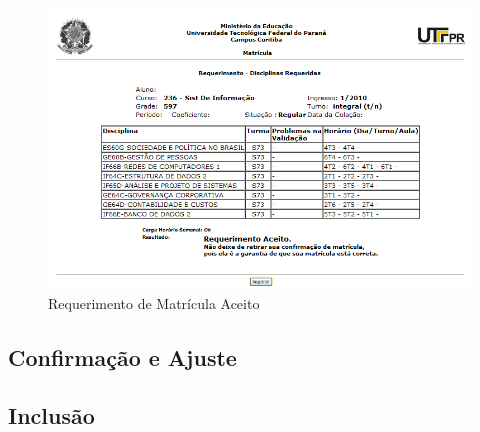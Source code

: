 \documentclass[a4paper,12pt,openany]{article}
\begin{document}
	\begin{figure}[ht!]  \centering
		\includegraphics[scale=0.5]{Matricula_Requerimento_Aceito.png}
		\caption{Requerimento de Matrícula Aceito}
		\label{matriculaRequerimentoAceito}
	\end{figure}


\subsection{Confirmação e Ajuste}


\subsection{Inclusão}
\end{document}
